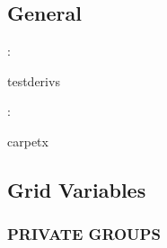 \vspace{3mm} \subsection*{General}

: 

testderivs
\vspace{2mm}

: 

carpetx
\vspace{2mm}
\subsection*{Grid Variables}
\vspace{5mm}\subsubsection{PRIVATE GROUPS}

\vspace{5mm}

